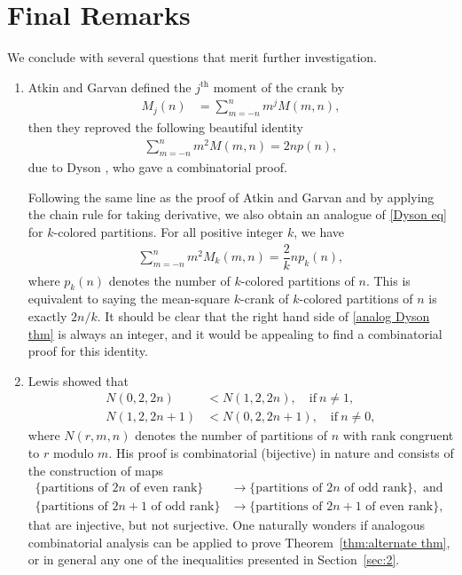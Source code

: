 \documentclass[12pt]{amsart}
\numberwithin{equation}{section}
\theoremstyle{plain}
\theoremstyle{definition}
\begin{document}
\section{Final Remarks}\label{sec4}

We conclude with several questions that merit further investigation.
\begin{enumerate}[1)]
\item Atkin and Garvan \cite{AG} defined the $j^{\text{th}}$ moment of the crank by
\begin{align*}
M_{j}(n) &=\sum_{m=-n}^{n}m^{j}M(m,n),
\end{align*}
then they reproved the following beautiful identity
\begin{align}\label{Dyson eq}
\sum_{m=-n}^{n}m^{2}M(m,n)=2np(n),
\end{align}
due to Dyson \cite{Dys2}, who gave a combinatorial proof.

Following the same line as the proof of Atkin and Garvan and by applying the chain rule for taking derivative, we also obtain an analogue of \eqref{Dyson eq} for $k$-colored partitions.
For all positive integer $k$, we have
\begin{align}\label{analog Dyson thm}
\sum_{m=-n}^{n}m^{2}M_{k}(m,n)=\dfrac{2}{k}np_{k}(n),
\end{align}
where $p_{k}(n)$ denotes the number of $k$-colored partitions of $n$. This is equivalent to saying the mean-square $k$-crank of $k$-colored partitions of $n$ is exactly $2n/k$. It should be clear that the right hand side of \eqref{analog Dyson thm} is always an integer, and it would be appealing to find a combinatorial proof for this identity.

\item Lewis \cite{Lew} showed that
\begin{align*}
N(0,2,2n) &<N(1,2,2n),\quad \textrm{if}~n\neq1,\\
N(1,2,2n+1) &<N(0,2,2n+1),\quad \textrm{if}~n\neq0,
\end{align*}
where $N(r,m,n)$ denotes the number of partitions of $n$ with rank congruent to $r$ modulo $m$. His proof is combinatorial (bijective) in nature and consists of the construction of maps
\begin{align*}
\{\textrm{partitions~of~$2n$~of~even~rank}\} &\rightarrow\{\textrm{partitions~of~$2n$~of~odd~rank}\}, \text{ and }\\
\{\textrm{partitions~of~$2n+1$~of~odd~rank}\} &\rightarrow\{\textrm{partitions~of~$2n+1$~of~even~rank}\},
\end{align*}
that are injective, but not surjective. One naturally wonders if analogous combinatorial analysis can be applied to prove Theorem~\ref{thm:alternate thm}, or in general any one of the inequalities presented in Section~\ref{sec:2}.


\end{enumerate}
\end{document}
